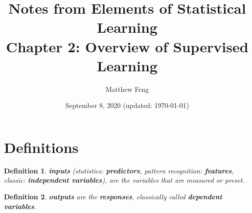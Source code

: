 \documentclass{article}
\title{
  Notes from {\bf Elements of Statistical Learning}\\
  Chapter 2: Overview of Supervised Learning\\
}
\author{Matthew Feng}
\date{September 8, 2020 (updated: \today)}
\newtheorem{definition}{Definition}
\begin{document}
\maketitle

\section{Definitions}

\begin{definition}
  \textbf{inputs} (statistics: \textbf{predictors}, pattern recognition:
  \textbf{features}, classic: \textbf{independent variables}), are the
  variables that are measured or preset.
\end{definition}

\begin{definition}
  \textbf{outputs} are the \textbf{responses}, classically called
  \textbf{dependent variables}.
\end{definition}
\end{document}
